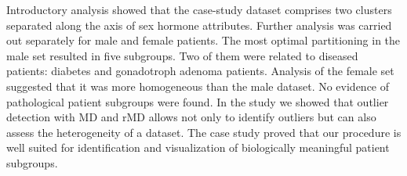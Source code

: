 \documentclass[11pt, a4paper]{article}
\begin{document}
Introductory analysis showed that the case-study dataset comprises two
clusters separated along the axis of sex hormone attributes. Further
analysis was carried out separately for male and female patients. The
most optimal partitioning in the male set resulted in five subgroups.
Two of them were related to diseased patients: diabetes and gonadotroph
adenoma patients. Analysis of the female set suggested that it was more
homogeneous than the male dataset. No evidence of pathological patient
subgroups were found. In the study we showed that outlier detection with
MD and rMD allows not only to identify outliers but can also assess the
heterogeneity of a dataset. The case study proved that our procedure is
well suited for identification and visualization of biologically
meaningful patient subgroups.
\end{document}
